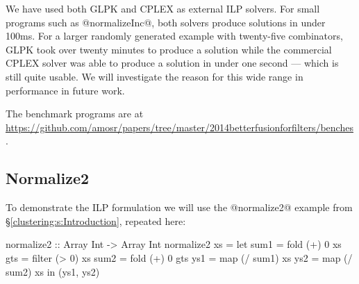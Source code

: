 We have used both GLPK and CPLEX as external ILP solvers. For small programs such as @normalizeInc@, both solvers produce solutions in under 100ms. For a larger randomly generated example with twenty-five combinators, GLPK took over twenty minutes to produce a solution while the commercial CPLEX solver was able to produce a solution in under one second --- which is still quite usable. We will investigate the reason for this wide range in performance in future work.


The benchmark programs are at \url{https://github.com/amosr/papers/tree/master/2014betterfusionforfilters/benches}.



\pagebreak
\subsection{Normalize2}
To demonstrate the ILP formulation we will use the @normalize2@ example from \S\ref{clustering:s:Introduction}, repeated here:
\begin{code}
  normalize2 :: Array Int -> Array Int
  normalize2 xs
   = let sum1 = fold   (+)  0   xs
         gts  = filter (>   0)  xs
         sum2 = fold   (+)  0   gts
         ys1  = map    (/ sum1) xs
         ys2  = map    (/ sum2) xs
     in (ys1, ys2)
\end{code}

